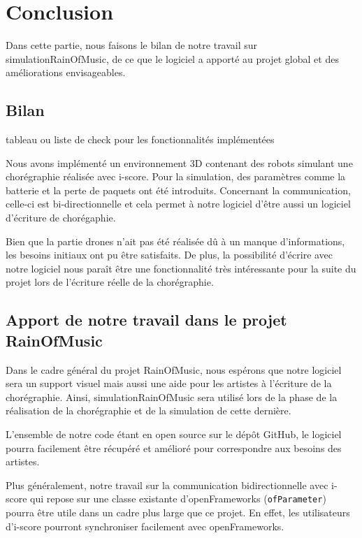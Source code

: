 \section{Conclusion}

Dans cette partie, nous faisons le bilan de notre travail sur simulationRainOfMusic, de ce que le logiciel a apporté au projet global et des améliorations envisageables.

\subsection{Bilan}

tableau ou liste de check pour les fonctionnalités implémentées

Nous avons implémenté un environnement 3D contenant des robots simulant une chorégraphie réalisée avec i-score. Pour la simulation, des paramètres comme la batterie et la perte de paquets ont été introduits. Concernant la communication, celle-ci est bi-directionnelle et cela permet à notre logiciel d'être aussi un logiciel d'écriture de chorégaphie. 

Bien que la partie drones n'ait pas été réalisée dû à un manque d'informations, les besoins initiaux ont pu être satisfaits. De plus, la possibilité d'écrire avec notre logiciel nous paraît être une fonctionnalité très intéressante pour la suite du projet lors de l'écriture réelle de la chorégraphie.

\subsection{Apport de notre travail dans le projet RainOfMusic}

Dans le cadre général du projet RainOfMusic, nous espérons que notre logiciel sera un support visuel mais aussi une aide pour les artistes à l'écriture de la chorégraphie. Ainsi, simulationRainOfMusic sera utilisé lors de la phase de la réalisation de la chorégraphie et de la simulation de cette dernière. 

L'ensemble de notre code étant en open source sur le dépôt GitHub, le logiciel pourra facilement être récupéré et amélioré pour correspondre aux besoins des artistes. 

Plus généralement, notre travail sur la communication bidirectionnelle avec i-score qui repose sur une classe existante d'openFrameworks (\verb|ofParameter|) pourra être utile dans un cadre plus large que ce projet. En effet, les utilisateurs d'i-score pourront synchroniser facilement avec openFrameworks.

